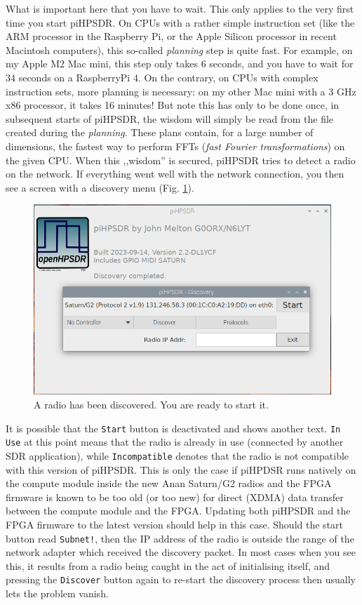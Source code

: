 \documentclass[12pt]{book}
\def\rett#1{\texttt{\color{red}#1}}
\def\pH{pi\-HPSDR\xspace}
\begin{document}
What is important here that you have to wait. This only applies to the very first time you start \pH.
On CPUs with a rather simple instruction set (like the ARM processor in the Raspberry Pi, or the Apple
Silicon processor in recent Macintosh computers), this so-called  \textit{planning} step is quite fast. For
example, on my
Apple M2 Mac mini, this step only takes 6 seconds, and you have to wait for 34 seconds on a RaspberryPi 4.
On the contrary, on CPUs with
complex instruction sets, more planning is necessary: on my other Mac mini with a 3 GHz x86 processor, it
takes 16 minutes! But note
this has only to be done once, in subsequent starts of \pH, the wisdom will simply be read from
the file created during the \textit{planning}. These plans contain, for a large number of dimensions,
the fastest way to perform FFTs (\textit{fast Fourier transformations}) on the given CPU.
When this ,,wisdom'' is secured, \pH tries to detect a radio on the network. If everything went well with
the network connection, you then see a screen with a discovery menu (Fig. \ref{fig:Start}).

\begin{figure}
\center
\includegraphics[width=12cm]{Start.png}
\caption{A radio has been discovered. You are ready  to start it.}
\label{fig:Start}
\end{figure}

It is possible that the \rett{Start} button is deactivated and shows another text. \rett{In Use} at
this point means that the radio is already in use (connected by another SDR application), while
\rett{Incompatible} denotes that the radio is not compatible with this version of \pH. This
is only the case if piHPDSR runs natively on the compute module inside the new Anan Saturn/G2
radios and the FPGA firmware is known to be too old (or too new)
for direct (XDMA) data transfer between the compute
module and the FPGA. Updating both \pH and the FPGA firmware to the latest version
should help in this case. Should the start button read \rett{Subnet!}, then the IP address of the
radio is outside the range of the network adapter which received the discovery packet.
In most cases when you see this, it results from a radio being caught in the act of initialising
itself, and pressing the \rett{Discover} button again to re-start the discovery process then
usually lets the problem vanish.
\end{document}

